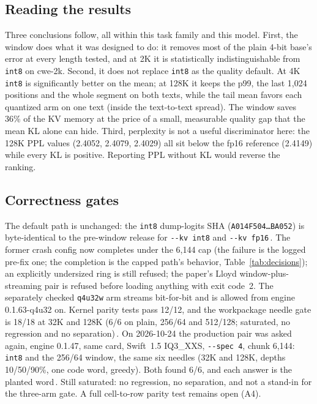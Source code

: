 \documentclass[10pt,twocolumn]{article}
\begin{document}
\subsection{Reading the results}

Three conclusions follow, all within this task family and this model. First, the window does what it was designed to do: it removes most of the plain 4-bit base's error at every length tested, and at 2K it is statistically indistinguishable from \texttt{int8} on cwe-2k. Second, it does not replace \texttt{int8} as the quality default. At 4K \texttt{int8} is significantly better on the mean; at 128K it keeps the p99, the last 1,024 positions and the whole segment on both texts, while the tail mean favors each quantized arm on one text (inside the text-to-text spread). The window saves 36\% of the KV memory at the price of a small, measurable quality gap that the mean KL alone can hide. Third, perplexity is not a useful discriminator here: the 128K PPL values (2.4052, 2.4079, 2.4029) all sit below the fp16 reference (2.4149) while every KL is positive. Reporting PPL without KL would reverse the ranking.

\subsection{Correctness gates}

The default path is unchanged: the \texttt{int8} dump-logits SHA (\texttt{A014F504\ldots BA052}) is byte-identical to the pre-window release for \texttt{-{}-kv int8} and \texttt{-{}-kv fp16}\,\cite{strata-details}. The former crash config now completes under the 6,144 cap (the failure is the logged pre-fix one; the completion is the capped path's behavior, Table~\ref{tab:decisions}); an explicitly undersized ring is still refused; the paper's Lloyd window-plus-streaming pair is refused before loading anything with exit code~2. The separately checked \texttt{q4u32w} arm streams bit-for-bit and is allowed from engine 0.1.63-q4u32 on. Kernel parity tests pass 12/12, and the workpackage needle gate is 18/18 at 32K and 128K (6/6 on plain, 256/64 and 512/128; saturated, no regression and no separation)\,\cite{strata-wp}. On 2026-10-24 the production pair was asked again, engine 0.1.47, same card, Swift~1.5 IQ3\_XXS, \texttt{-{}-spec 4}, chunk 6,144: \texttt{int8} and the 256/64 window, the same six needles (32K and 128K, depths 10/50/90\%, one code word, greedy). Both found 6/6, and each answer is the planted word\,\cite{strata-needle24}. Still saturated: no regression, no separation, and not a stand-in for the three-arm gate. A full cell-to-row parity test remains open (A4).
\end{document}
